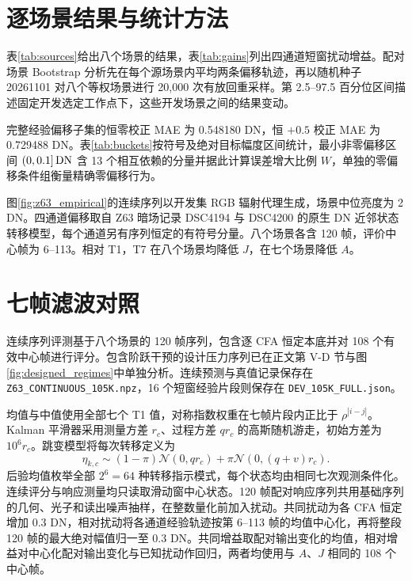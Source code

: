 \section{逐场景结果与统计方法}
\label{app:statistics}



表\ref{tab:sources}给出八个场景的结果，表\ref{tab:gains}列出四通道短窗扰动增益。配对场景 Bootstrap 分析先在每个源场景内平均两条偏移轨迹，再以随机种子 20261101 对八个等权场景进行 20,000 次有放回重采样。第 2.5--97.5 百分位区间描述固定开发选定工作点下，这些开发场景之间的结果变动。

完整经验偏移子集的恒零校正 MAE 为 0.548180 DN，恒 $+0.5$ 校正 MAE 为 0.729488 DN。表\ref{tab:buckets}按符号及绝对目标幅度区间统计，最小非零偏移区间 $(0,0.1]\,\mathrm{DN}$ 含 13 个相互依赖的分量并据此计算误差增大比例 $W$，单独的零偏移条件组衡量精确零偏移行为。

图\ref{fig:z63_empirical}的连续序列以开发集 RGB 辐射代理生成，场景中位亮度为 2 DN。四通道偏移取自 Z63 暗场记录 DSC4194 与 DSC4200 的原生 DN 近邻状态转移模型，每个通道另有序列恒定的有符号分量。八个场景各含 120 帧，评价中心帧为 6--113。相对 T1，T7 在八个场景均降低 $J$，在七个场景降低 $A$。


\section{七帧滤波对照}
\label{app:filters}
连续序列评测基于八个场景的 120 帧序列，包含逐 CFA 恒定本底并对 108 个有效中心帧进行评分。包含阶跃干预的设计压力序列已在正文第 V-D 节与图\ref{fig:designed_regimes}中单独分析。连续预测与真值记录保存在 \texttt{Z63\_CONTINUOUS\_105K.npz}，16 个短窗经验片段则保存在 \texttt{DEV\_105K\_FULL.json}。

均值与中值使用全部七个 T1 值，对称指数权重在七帧片段内正比于 $\rho^{|i-j|}$。Kalman 平滑器采用测量方差 $r_c$、过程方差 $qr_c$ 的高斯随机游走，初始方差为 $10^6r_c$。跳变模型将每次转移定义为
\begin{equation}
 \eta_{k,c}\sim(1-\pi)\mathcal N(0,qr_c)+\pi\mathcal N(0,(q+v)r_c).
\end{equation}
后验均值枚举全部 $2^6=64$ 种转移指示模式，每个状态均由相同七次观测条件化。连续评分与响应测量均只读取滑动窗中心状态。120 帧配对响应序列共用基础序列的几何、光子和读出噪声抽样，在整数量化前加入扰动。共同扰动为各 CFA 恒定增加 0.3 DN，相对扰动将各通道经验轨迹按第 6--113 帧的均值中心化，再将整段 120 帧的最大绝对幅值归一至 0.3 DN。共同增益取配对输出变化的均值，相对增益对中心化配对输出变化与已知扰动作回归，两者均使用与 $A$、$J$ 相同的 108 个中心帧。

